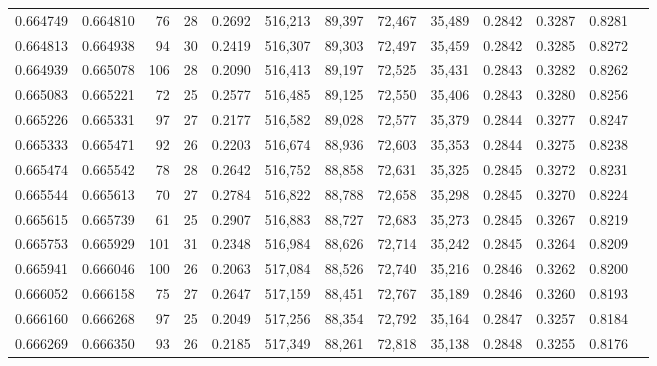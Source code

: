 \begin{tabular}{rrrrrrrrrrrrr}
0.664749 & 0.664810 &    76 &  28 &                                     0.2692 & 516,213 &  89,397 &  72,467 &  35,489 & 0.2842 & 0.3287 & 0.8281 \\
0.664813 & 0.664938 &    94 &  30 &                                     0.2419 & 516,307 &  89,303 &  72,497 &  35,459 & 0.2842 & 0.3285 & 0.8272 \\
0.664939 & 0.665078 &   106 &  28 &                                     0.2090 & 516,413 &  89,197 &  72,525 &  35,431 & 0.2843 & 0.3282 & 0.8262 \\
0.665083 & 0.665221 &    72 &  25 &                                     0.2577 & 516,485 &  89,125 &  72,550 &  35,406 & 0.2843 & 0.3280 & 0.8256 \\
0.665226 & 0.665331 &    97 &  27 &                                     0.2177 & 516,582 &  89,028 &  72,577 &  35,379 & 0.2844 & 0.3277 & 0.8247 \\
0.665333 & 0.665471 &    92 &  26 &                                     0.2203 & 516,674 &  88,936 &  72,603 &  35,353 & 0.2844 & 0.3275 & 0.8238 \\
0.665474 & 0.665542 &    78 &  28 &                                     0.2642 & 516,752 &  88,858 &  72,631 &  35,325 & 0.2845 & 0.3272 & 0.8231 \\
0.665544 & 0.665613 &    70 &  27 &                                     0.2784 & 516,822 &  88,788 &  72,658 &  35,298 & 0.2845 & 0.3270 & 0.8224 \\
0.665615 & 0.665739 &    61 &  25 &                                     0.2907 & 516,883 &  88,727 &  72,683 &  35,273 & 0.2845 & 0.3267 & 0.8219 \\
0.665753 & 0.665929 &   101 &  31 &                                     0.2348 & 516,984 &  88,626 &  72,714 &  35,242 & 0.2845 & 0.3264 & 0.8209 \\
0.665941 & 0.666046 &   100 &  26 &                                     0.2063 & 517,084 &  88,526 &  72,740 &  35,216 & 0.2846 & 0.3262 & 0.8200 \\
0.666052 & 0.666158 &    75 &  27 &                                     0.2647 & 517,159 &  88,451 &  72,767 &  35,189 & 0.2846 & 0.3260 & 0.8193 \\
0.666160 & 0.666268 &    97 &  25 &                                     0.2049 & 517,256 &  88,354 &  72,792 &  35,164 & 0.2847 & 0.3257 & 0.8184 \\
0.666269 & 0.666350 &    93 &  26 &                                     0.2185 & 517,349 &  88,261 &  72,818 &  35,138 & 0.2848 & 0.3255 & 0.8176 \\

\end{tabular}
